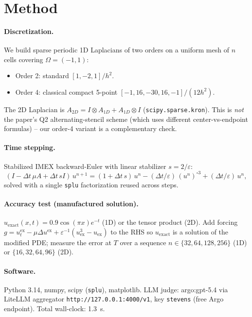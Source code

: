 \documentclass[11pt]{article}
\begin{document}
\section{Method}
\label{sec:method}

\paragraph{Discretization.}
We build sparse periodic 1D Laplacians of two orders on a uniform mesh of
$n$ cells covering $\Omega = (-1,1)$:
\begin{itemize}
  \item Order 2: standard $[1,-2,1]/h^2$.
  \item Order 4: classical compact 5-point $[-1,16,-30,16,-1]/(12 h^2)$.
\end{itemize}
The 2D Laplacian is $A_{2D} = I \otimes A_{1D} + A_{1D} \otimes I$
(\texttt{scipy.sparse.kron}). This is \emph{not} the paper's Q2
alternating-stencil scheme (which uses different center-vs-endpoint
formulas) -- our order-4 variant is a complementary check.

\paragraph{Time stepping.}
Stabilized IMEX backward-Euler with linear stabilizer $s = 2/\varepsilon$:
\begin{equation*}
  (I - \Delta t\, \mu A + \Delta t\, s I)\, u^{n+1}
   = (1 + \Delta t\, s)\, u^n - (\Delta t / \varepsilon)\,(u^n)^{\circ 3} + (\Delta t /\varepsilon)\, u^n,
\end{equation*}
solved with a single \texttt{splu} factorization reused across steps.

\paragraph{Accuracy test (manufactured solution).}
$u_{\mathrm{exact}}(x,t) = 0.9 \cos(\pi x) e^{-t}$ (1D) or the tensor
product (2D). Add forcing $g = u_t^{\mathrm{ex}} - \mu \Delta u^{\mathrm{ex}}
+ \varepsilon^{-1}(u_{\mathrm{ex}}^3 - u_{\mathrm{ex}})$ to the RHS so
$u_{\mathrm{exact}}$ is a solution of the modified PDE; measure the error
at $T$ over a sequence $n \in \{32,64,128,256\}$ (1D) or
$\{16,32,64,96\}$ (2D).

\paragraph{Software.}
Python 3.14, numpy, scipy (\texttt{splu}), matplotlib. LLM judge:
argo:gpt-5.4 via LiteLLM aggregator \texttt{http://127.0.0.1:4000/v1},
key \texttt{stevens} (free Argo endpoint). Total wall-clock: 1.3~s.
\end{document}
